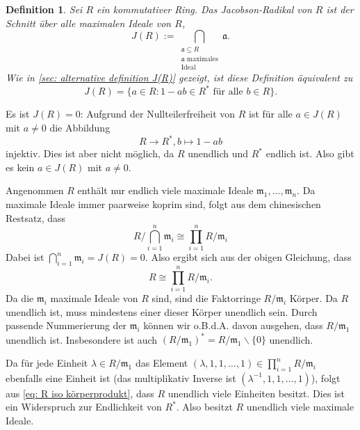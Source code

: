 \documentclass[a4paper,10pt]{article}
\newtheorem*{defi}{Definition}
\newcommand{\mf}[1]{\mathfrak{#1}}
\begin{document}
\section{}

\begin{defi}
 Sei $R$ ein kommutativer Ring. Das \emph{Jacobson-Radikal} von $R$ ist der Schnitt über alle maximalen Ideale von $R$,
 \[
  J(R)
  := \bigcap_{\substack{\mf{a} \subseteq R \\ \text{$\mf{a}$ maximales} \\ \text{Ideal}}} \mf{a}.
 \]
 Wie in \ref{sec: alternative definition J(R)} gezeigt, ist diese Definition äquivalent zu
 \[
  J(R) = \{a \in R : 1-ab \in R^* \text{ für alle } b \in R\}.
 \]
\end{defi}

Es ist $J(R) = 0$: Aufgrund der Nullteilerfreiheit von $R$ ist für alle $a \in J(R)$ mit $a \neq 0$ die Abbildung
\[
 R \rightarrow R^*, b \mapsto 1-ab
\]
injektiv. Dies ist aber nicht möglich, da $R$ unendlich und $R^*$ endlich ist. Also gibt es kein $a \in J(R)$ mit $a \neq 0$.

Angenommen $R$ enthält nur endlich viele maximale Ideale $\mf{m}_1, \ldots, \mf{m}_n$. Da maximale Ideale immer paarweise koprim sind, folgt aus dem chinesischen Restsatz, dass
\[
 R/\bigcap_{i=1}^n \mf{m}_i \cong \prod_{i=1}^n R/\mf{m}_i
\]
Dabei ist $\bigcap_{i=1}^n \mf{m}_i = J(R) = 0$. Also ergibt sich aus der obigen Gleichung, dass
\begin{equation}\label{eq: R iso körperprodukt}
 R \cong \prod_{i=1}^n R/\mf{m}_i.
\end{equation}
Da die $\mf{m}_i$ maximale Ideale von $R$ sind, sind die Faktorringe $R/\mf{m}_i$ Körper. Da $R$ unendlich ist, muss mindestens einer dieser Körper unendlich sein. Durch passende Nummerierung der $\mf{m}_i$ können wir o.B.d.A. davon ausgehen, dass $R/\mf{m}_1$ unendlich ist. Insbesondere ist auch $(R/\mf{m}_1)^* = R/\mf{m}_1 \smallsetminus \{0\}$ unendlich.

Da für jede Einheit $\lambda \in R/\mf{m}_1$ das Element $(\lambda, 1, 1, \ldots, 1) \in \prod_{i=1}^n R/\mf{m}_i$ ebenfalls eine Einheit ist (das multiplikativ Inverse ist $(\lambda^{-1}, 1, 1, \ldots, 1)$), folgt aus \eqref{eq: R iso körperprodukt}, dass $R$ unendlich viele Einheiten besitzt. Dies ist ein Widerspruch zur Endlichkeit von $R^*$. Also besitzt $R$ unendlich viele maximale Ideale.
\end{document}
